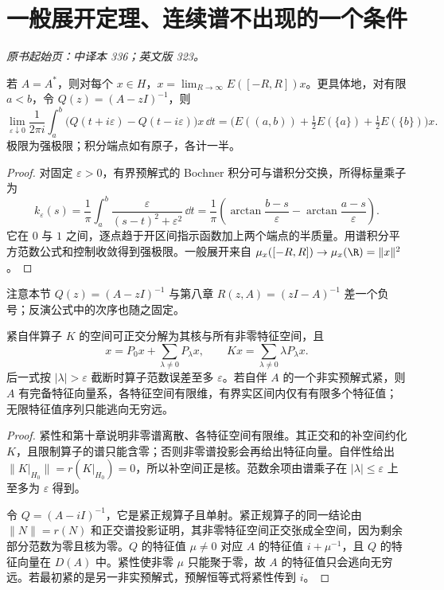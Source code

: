 \section{一般展开定理、连续谱不出现的一个条件}\label{sec:yosida-11-09}
\noindent\textit{原书起始页：中译本 336；英文版 323。}

\begin{theorem}[一般展开与预解式反演]\label{thm:y11-stone-formula}
若 $A=A^*$，则对每个 $x\in H$，$x=\lim_{R\to\infty}E([-R,R])x$。更具体地，对有限 $a<b$，令 $Q(z)=(A-zI)^{-1}$，则
\[
 \lim_{\varepsilon\downarrow0}\frac1{2\pi i}
 \int_a^b\bigl(Q(t+i\varepsilon)-Q(t-i\varepsilon)\bigr)x\,\dd t
 =\bigl(E((a,b))+\tfrac12E(\{a\})+\tfrac12E(\{b\})\bigr)x.
\]
极限为强极限；积分端点如有原子，各计一半。
\end{theorem}
\begin{proof}
对固定 $\varepsilon>0$，有界预解式的 Bochner 积分可与谱积分交换，所得标量乘子为
\[
 k_\varepsilon(s)=\frac1\pi\int_a^b
 \frac{\varepsilon}{(s-t)^2+\varepsilon^2}\,\dd t
 =\frac1\pi\left(\arctan\frac{b-s}{\varepsilon}-\arctan\frac{a-s}{\varepsilon}\right).
\]
它在 $0$ 与 $1$ 之间，逐点趋于开区间指示函数加上两个端点的半质量。用谱积分平方范数公式和控制收敛得到强极限。一般展开来自 $\mu_x([-R,R])\to\mu_x(\R)=\|x\|^2$。
\end{proof}

注意本节 $Q(z)=(A-zI)^{-1}$ 与第八章 $R(z,A)=(zI-A)^{-1}$ 差一个负号；反演公式中的次序也随之固定。

\begin{theorem}[紧自伴展开与紧预解式]\label{thm:y11-compact-expansion}
紧自伴算子 $K$ 的空间可正交分解为其核与所有非零特征空间，且
\[
 x=P_0x+\sum_{\lambda\ne0}P_\lambda x,\qquad
 Kx=\sum_{\lambda\ne0}\lambda P_\lambda x.
\]
后一式按 $|\lambda|>\varepsilon$ 截断时算子范数误差至多 $\varepsilon$。若自伴 $A$ 的一个非实预解式紧，则 $A$ 有完备特征向量系，各特征空间有限维，有界实区间内仅有有限多个特征值；无限特征值序列只能逃向无穷远。
\end{theorem}
\begin{proof}
紧性和第十章说明非零谱离散、各特征空间有限维。其正交和的补空间约化 $K$，且限制算子的谱只能含零；否则非零谱投影会再给出特征向量。自伴性给出 $\|K|_{H_0}\|=r(K|_{H_0})=0$，所以补空间正是核。范数余项由谱乘子在 $|\lambda|\le\varepsilon$ 上至多为 $\varepsilon$ 得到。

令 $Q=(A-iI)^{-1}$，它是紧正规算子且单射。紧正规算子的同一结论由 $\|N\|=r(N)$ 和正交谱投影证明，其非零特征空间正交张成全空间，因为剩余部分范数为零且核为零。$Q$ 的特征值 $\mu\ne0$ 对应 $A$ 的特征值 $i+\mu^{-1}$，且 $Q$ 的特征向量在 $D(A)$ 中。紧性使非零 $\mu$ 只能聚于零，故 $A$ 的特征值只会逃向无穷远。若最初紧的是另一非实预解式，预解恒等式将紧性传到 $i$。
\end{proof}

